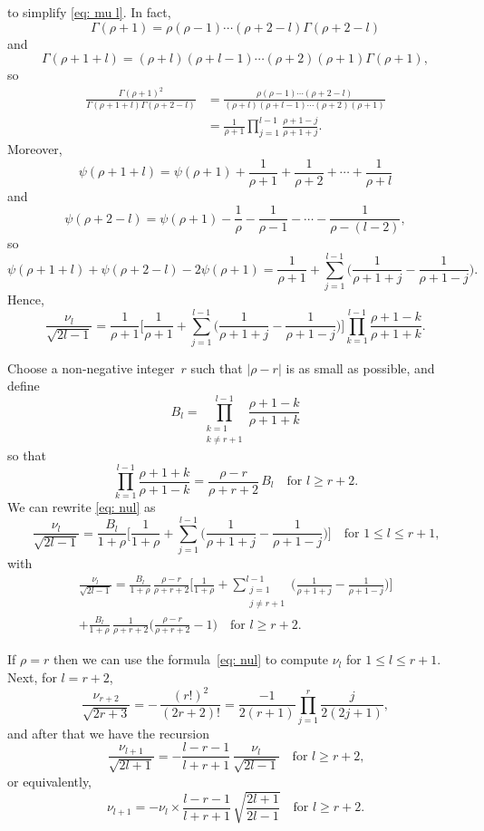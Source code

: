 \documentclass[12pt,a4paper]{article}
\begin{document}
to simplify \eqref{eq: mu l}.  In fact,
\[
\Gamma(\rho+1)=\rho(\rho-1)\cdots(\rho+2-l)\Gamma(\rho+2-l)
\]
and
\[
\Gamma(\rho+1+l)=(\rho+l)(\rho+l-1)\cdots(\rho+2)(\rho+1)
	\Gamma(\rho+1),
\]
so
\begin{align*}
\frac{\Gamma(\rho+1)^2}{\Gamma(\rho+1+l)\Gamma(\rho+2-l)}
	&=\frac{\rho(\rho-1)\cdots(\rho+2-l)}%
{(\rho+l)(\rho+l-1)\cdots(\rho+2)(\rho+1)}\\
	&=\frac{1}{\rho+1}\prod_{j=1}^{l-1}\frac{\rho+1-j}{\rho+1+j}.
\end{align*}
Moreover,
\[
\psi(\rho+1+l)=\psi(\rho+1)+\frac{1}{\rho+1}+\frac{1}{\rho+2}
	+\cdots+\frac{1}{\rho+l}
\]
and
\[
\psi(\rho+2-l)=\psi(\rho+1)-\frac{1}{\rho}-\frac{1}{\rho-1}
	-\cdots-\frac{1}{\rho-(l-2)},
\]
so
\[
\psi(\rho+1+l)+\psi(\rho+2-l)-2\psi(\rho+1)
	=\frac{1}{\rho+1}+\sum_{j=1}^{l-1}\biggl(\frac{1}{\rho+1+j}
		-\frac{1}{\rho+1-j}\biggr).
\]
Hence,
\begin{equation}\label{eq: nul}
\frac{\nu_l}{\sqrt{2l-1}}=\frac{1}{\rho+1}\biggl[\frac{1}{\rho+1}
	+\sum_{j=1}^{l-1}\biggl(\frac{1}{\rho+1+j}
		-\frac{1}{\rho+1-j}\biggr)\biggr]
	\prod_{k=1}^{l-1}\frac{\rho+1-k}{\rho+1+k}.
\end{equation}

Choose a non-negative integer~$r$ such that $|\rho-r|$ is as small as 
possible, and define
\[
B_l=\prod_{\substack{k=1\\ k\ne r+1}}^{l-1}\frac{\rho+1-k}{\rho+1+k}
\]
so that
\[
\prod_{k=1}^{l-1}\frac{\rho+1+k}{\rho+1-k}
	=\frac{\rho-r}{\rho+r+2}\,B_l\quad\text{for $l\ge r+2$.}
\]
We can rewrite \eqref{eq: nul} as
\[
\frac{\nu_l}{\sqrt{2l-1}}=\frac{B_l}{1+\rho}\biggl[
	\frac{1}{1+\rho}+\sum_{j=1}^{l-1}
	\biggl(\frac{1}{\rho+1+j}-\frac{1}{\rho+1-j}\biggr)
		\biggr]\quad\text{for $1\le l\le r+1$,}
\]
with
\begin{multline*}
\frac{\nu_l}{\sqrt{2l-1}}=\frac{B_l}{1+\rho}\,\frac{\rho-r}{\rho+r+2}
	\biggl[\frac{1}{1+\rho}
	+\sum_{\substack{j=1\\ j\ne r+1}}^{l-1}\biggl(
	\frac{1}{\rho+1+j}-\frac{1}{\rho+1-j}\biggr)\biggr]\\
+\frac{B_l}{1+\rho}\,\frac{1}{\rho+r+2}
	\biggl(\frac{\rho-r}{\rho+r+2}-1\biggr)
		\quad\text{for $l\ge r+2$.}
\end{multline*}


If $\rho=r$ then we can use the formula~\eqref{eq: nul} to compute
$\nu_l$ for $1\le l\le r+1$.  Next, for $l=r+2$,
\[
\frac{\nu_{r+2}}{\sqrt{2r+3}}
	=-\,\frac{(r!)^2}{(2r+2)!}=\frac{-1}{2(r+1) }
	\prod_{j=1}^r\frac{j}{2(2j+1)},
\]
and after that we have the recursion
\[
\frac{\nu_{l+1}}{\sqrt{2l+1}}=-\frac{l-r-1}{l+r+1}\,
	\frac{\nu_l}{\sqrt{2l-1}}
	\quad\text{for $l\ge r+2$,}
\]
or equivalently,
\[
\nu_{l+1}=-\nu_l\times\frac{l-r-1}{l+r+1}\,\sqrt{\frac{2l+1}{2l-1}}
	\quad\text{for $l\ge r+2$.}
\]
\end{document}
